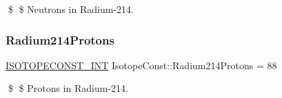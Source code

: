 \$ \$ Neutrons in Radium-\/214. \mbox{\label{group___isotope_const-_radium-_ra214_ga38c46286182c90617cd66f6131caf741}} 
\subsubsection{\texorpdfstring{Radium214\+Protons}{Radium214Protons}}
{\footnotesize\ttfamily \mbox{\hyperlink{group___isotope_const-_macros_ga5f18360b3e99483a35c32d789e62621c}{I\+S\+O\+T\+O\+P\+E\+C\+O\+N\+S\+T\+\_\+\+I\+NT}} Isotope\+Const\+::\+Radium214\+Protons = 88}

\$ \$ Protons in Radium-\/214. 